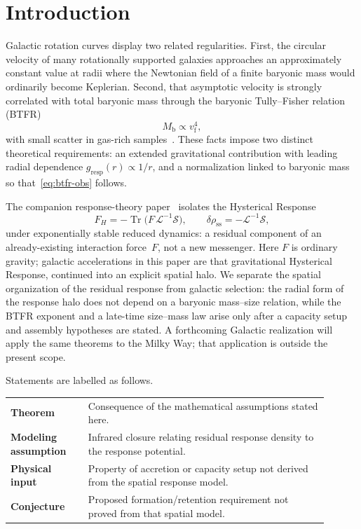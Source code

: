 \documentclass[11pt]{article}
\theoremstyle{definition}
\theoremstyle{remark}
\newcommand{\Mb}{M_{\mathrm{b}}}
\newcommand{\vf}{v_{\mathrm{f}}}
\newcommand{\Tr}{\operatorname{Tr}}
\newcommand{\FH}{F_H}
\begin{document}
\section{Introduction}
\label{sec:intro}
Galactic rotation curves display two related regularities.
First, the circular velocity of many rotationally supported galaxies approaches an approximately constant value at radii where the Newtonian field of a finite baryonic mass would ordinarily become Keplerian.
Second, that asymptotic velocity is strongly correlated with total baryonic mass through the baryonic Tully--Fisher relation (BTFR)
\begin{equation}
  \Mb\propto\vf^{4},
  \label{eq:btfr-obs}
\end{equation}
with small scatter in gas-rich samples~\cite{mcgaugh2012,lelli2016}.
These facts impose two distinct theoretical requirements: an extended gravitational contribution with leading radial dependence $g_{\mathrm{resp}}(r)\propto 1/r$, and a normalization linked to baryonic mass so that~\eqref{eq:btfr-obs} follows.

The companion response-theory paper~\cite{boyd2026response} isolates the Hysterical Response
\begin{equation}
  \FH=-\Tr\!\bigl(F\,\mathcal L^{-1}\mathcal S\bigr),
  \qquad\delta\rho_{\mathrm{ss}}=-\mathcal L^{-1}\mathcal S,
\end{equation}
under exponentially stable reduced dynamics: a residual component of an already-existing interaction force~$F$, not a new messenger.
Here $F$ is ordinary gravity; galactic accelerations in this paper are that gravitational Hysterical Response, continued into an explicit spatial halo.
We separate the spatial organization of the residual response from galactic selection: the radial form of the response halo does not depend on a baryonic mass--size relation, while the BTFR exponent and a late-time size--mass law arise only after a capacity setup and assembly hypotheses are stated.
A forthcoming Galactic realization will apply the same theorems to the Milky Way; that application is outside the present scope.

Statements are labelled as follows.
\begin{center}
\begin{tabular}{>{\bfseries}p{0.22\linewidth}p{0.68\linewidth}}
Theorem & Consequence of the mathematical assumptions stated here.\\
Modeling assumption & Infrared closure relating residual response density to the response potential.\\
Physical input & Property of accretion or capacity setup not derived from the spatial response model.\\
Conjecture & Proposed formation/retention requirement not proved from that spatial model.\\
\end{tabular}
\end{center}
\end{document}
